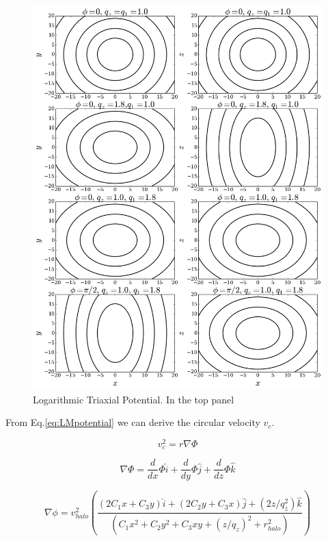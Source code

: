 \begin{figure}\label{fig:Logarithmic}
\includegraphics[scale=0.5]{../figures/triaxial_potential.png}
\caption{Logarithmic Triaxial Potential. In the top panel}
\end{figure}



From Eq.\ref{eq:LMpotential} we can derive the circular velocity $v_c$.

\begin{equation}
v_c^2 = r \nabla  \Phi 
\end{equation}

\begin{equation}
\nabla \Phi = \dfrac{d}{dx} \Phi \hat{i} + \dfrac{d}{dy} \Phi \hat{j} + \dfrac{d}{dz} \Phi \hat{k}
\end{equation}

\begin{equation}
\nabla \phi = v_{halo}^2  \left( \dfrac{(2C_1x + C_3 y)\hat{i} + (2C_2y + C_3x)\hat{j} + (2z/q_z^2)\hat{k}}{(C_1 x^2 + C_2 y^2 + C_3 x y + (z/q_z)^2 + r_{halo}^2)}    \right)
\end{equation}

